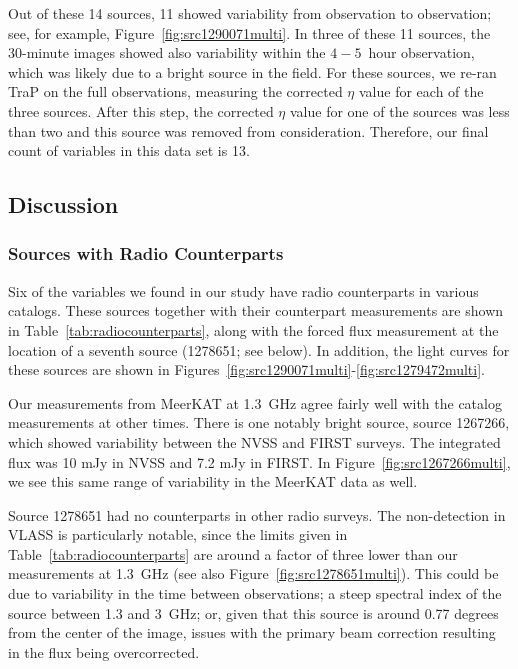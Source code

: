 \documentclass[12pt]{article}
\begin{document}
Out of these 14 sources, 11 showed variability from observation to observation; see, for example, Figure~\ref{fig:src1290071multi}. In three of these 11 sources, the 30-minute images showed also variability within the $4-5$~hour observation, which was likely due to a bright source in the field. For these sources, we re-ran TraP on the full observations, measuring the corrected $\eta$ value for each of the three sources. After this step, the corrected $\eta$ value for one of the sources was less than two and this source was removed from consideration. Therefore, our final count of variables in this data set is 13.




\subsection{Discussion}
\label{sec:discussion3}
\subsubsection{Sources with Radio Counterparts}

Six of the variables we found in our study have radio counterparts in various catalogs. These sources together with their counterpart measurements are shown in Table~\ref{tab:radiocounterparts}, along with the forced flux measurement at the location of a seventh source (1278651; see below). In addition, the light curves for these sources are shown in Figures~\ref{fig:src1290071multi}-\ref{fig:src1279472multi}. 

Our measurements from MeerKAT at 1.3~GHz agree fairly well with the catalog measurements at other times. There is one notably bright source, source 1267266, which showed variability between the NVSS and FIRST surveys. The integrated flux was 10 mJy in NVSS and 7.2 mJy in FIRST. In Figure~\ref{fig:src1267266multi}, we see this same range of variability in the MeerKAT data as well. 

Source 1278651 had no counterparts in other radio surveys. The non-detection in VLASS is particularly notable, since the limits given in Table~\ref{tab:radiocounterparts} are around a factor of three lower than our measurements at 1.3~GHz (see also Figure~\ref{fig:src1278651multi}). This could be due to variability in the time between observations; a steep spectral index of the source between 1.3 and 3~GHz; or, given that this source is around 0.77 degrees from the center of the image, issues with the primary beam correction resulting in the flux being overcorrected.
\end{document}
